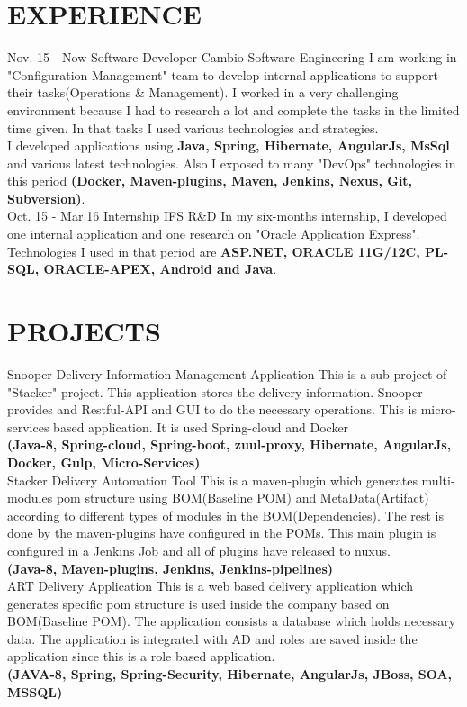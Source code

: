 \documentclass[]{cv-class}
\begin{document}
\section{EXPERIENCE}
\begin{entrylist}
  \entry
    {Nov. 15 - Now}
    {Software Developer}
    {Cambio Software Engineering}
    {I am working in "Configuration Management" team to develop internal applications to support their tasks(Operations \& Management). I worked in a very challenging environment because I had to research a lot and complete the tasks in the limited time given. In that tasks I used various technologies and strategies. \\I developed applications using \textbf{Java, Spring, Hibernate, AngularJs, MsSql} and various latest technologies. Also I exposed to many "DevOps" technologies in this period \textbf{(Docker, Maven-plugins, Maven, Jenkins, Nexus, Git, Subversion)}.}
\\
  \entry
    {Oct. 15 - Mar.16}
    {Internship}
    {IFS R\&D}
    {In my six-months internship, I developed one internal application and one research on "Oracle Application Express". Technologies I used in that period are \textbf{ASP.NET, ORACLE 11G/12C, PL-SQL, ORACLE-APEX, Android and Java}.}
\end{entrylist}

\section{PROJECTS}
\begin{entrylist}
\entry
    {}
	{Snooper}    
    {Delivery Information Management Application}
{This is a sub-project of "Stacker" project. This application stores the delivery information. Snooper provides and Restful-API and GUI to do the necessary operations. This is micro-services based application. It is used Spring-cloud and Docker \\\textbf{(Java-8, Spring-cloud, Spring-boot, zuul-proxy, Hibernate, AngularJs, Docker, Gulp, Micro-Services)}}
\\
\entry
    {}
	{Stacker}    
    {Delivery Automation Tool}
{This is a maven-plugin which generates multi-modules pom structure using BOM(Baseline POM) and MetaData(Artifact) according to different types of modules in the BOM(Dependencies). The rest is done by the maven-plugins have configured in the POMs. This main plugin is configured in a Jenkins Job and all of plugins have released to nuxus.
    \\\textbf{(Java-8, Maven-plugins, Jenkins, Jenkins-pipelines)}}
\\
\entry
    {}
	{ART}    
    {Delivery Application}
{This is a web based delivery application which generates specific pom structure is used inside the company based on BOM(Baseline POM). The application consists a database which holds necessary data. The application is integrated with AD and roles are saved inside the application since this is a role based application. \\\textbf{(JAVA-8, Spring, Spring-Security, Hibernate, AngularJs, JBoss, SOA, MSSQL)}}
	
\end{entrylist}
\end{document}
